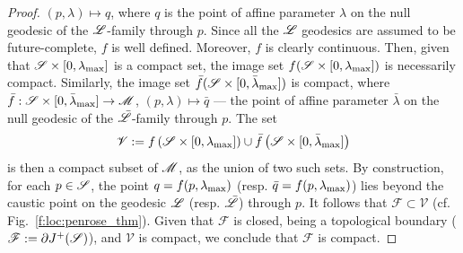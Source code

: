 \begin{proof}
$(p,\lambda) \mapsto q$, where $q$ is the point of affine parameter $\lambda$
on the null geodesic of the $\mathscr{L}$-family through $p$.
Since all the $\mathscr{L}$ geodesics are assumed to be future-complete, $f$ is well defined.
Moreover, $f$ is clearly continuous. Then, given that
$\mathscr{S} \times [0,\lambda_{\rm max}]$ is a compact set, the image set
$f(\mathscr{S} \times [0,\lambda_{\rm max}])$ is necessarily compact. Similarly, the image set
$\bar{f}(\mathscr{S} \times [0,\bar\lambda_{\rm max}])$ is compact, where
$\bar{f}: \mathscr{S} \times [0,\bar\lambda_{\rm max}] \to \mathscr{M}$, $(p,\lambda) \mapsto \bar{q}$ --- the point of affine parameter $\bar\lambda$
on the null geodesic of the $\bar{\mathscr{L}}$-family through $p$.
The set
\[
    \mathscr{V} := f\left(\mathscr{S} \times [0,\lambda_{\rm max}]\right)
        \cup \bar{f}\left(\mathscr{S} \times [0,\bar\lambda_{\rm max}]\right)
\]
is then a compact subset of $\mathscr{M}$, as the union of two such sets. By construction, for each $p\in\mathscr{S}$, the
point $q = f(p,\lambda_{\rm max})$ (resp. $\bar{q} = f(p,\lambda_{\rm max})$)
lies beyond the caustic point on the geodesic $\mathscr{L}$ (resp. $\bar{\mathscr{L}}$)
through $p$. It follows that $\mathscr{F} \subset \mathscr{V}$ (cf. Fig.~\ref{f:loc:penrose_thm}).
Given that $\mathscr{F}$
is closed, being a topological boundary ($\mathscr{F} := \partial J^+(\mathscr{S})$),
and $\mathscr{V}$ is compact, we conclude that $\mathscr{F}$ is compact.


\end{proof}
